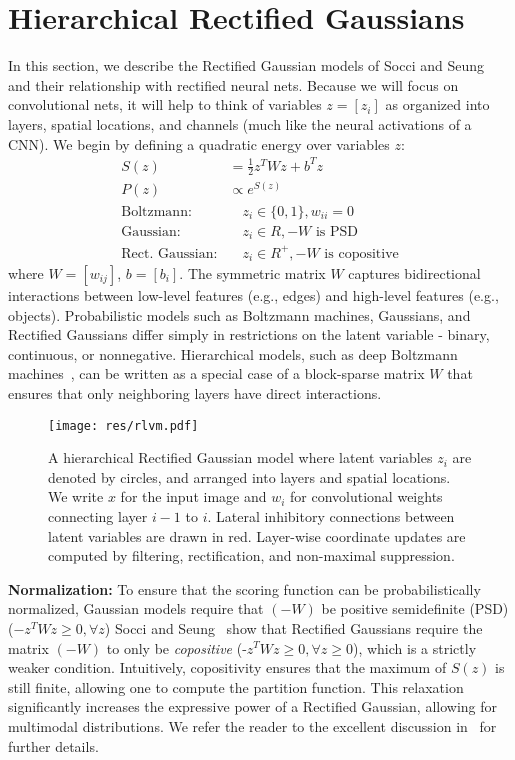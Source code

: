 \documentclass[10pt,twocolumn,letterpaper]{article}
\begin{document}
\section{Hierarchical Rectified Gaussians} \label{sec:lvm} In this
section, we describe the Rectified Gaussian models of Socci and
Seung~\cite{socci1998rectified} and their relationship with rectified
neural nets. Because we will focus on convolutional nets, it will help
to think of variables $z = [z_i]$ as organized into layers, spatial
locations, and channels (much like the neural activations of a CNN).
We begin by defining a quadratic energy over variables
$z$:
\begin{align}
  S(z) &= \frac{1}{2} z^T W z + b^Tz \label{eq:score}\\
  P(z) &\propto e^{S(z)} \nonumber\\
  \text{Boltzmann:} & \quad z_i \in \{0,1\}, w_{ii} = 0 \nonumber\\
  \text{Gaussian:} & \quad z_i \in R, -W \text{ is PSD} \nonumber\\\text{Rect. Gaussian:} & \quad z_i \in R^+, -W \text{ is copositive} \nonumber \end{align}
where $W = [w_{ij}]$, $b=[b_i]$. The symmetric matrix $W$ captures
bidirectional interactions between low-level features (e.g., edges)
and high-level features (e.g., objects). Probabilistic models such as
Boltzmann machines, Gaussians, and Rectified Gaussians differ simply
in restrictions on the latent variable - binary, continuous, or
nonnegative. Hierarchical models, such as deep Boltzmann
machines~\cite{salakhutdinov2009deep}, can be written as a special
case of a block-sparse matrix $W$ that ensures that only neighboring
layers have direct interactions.

\begin{figure}[t!]
  \centering
  \texttt{[image: res/rlvm.pdf]}
\caption{A hierarchical Rectified Gaussian model where latent
    variables $z_i$ are denoted by circles, and arranged into layers and
    spatial locations. We write $x$ for the input image and $w_i$ for
    convolutional weights connecting layer $i-1$ to $i$. Lateral
    inhibitory connections between latent variables are drawn in
    red. Layer-wise coordinate updates are computed by filtering,
    rectification, and non-maximal suppression.}
  \label{fig:rlvm}
\end{figure}

{\bf Normalization:} To ensure that the scoring function can be
probabilistically normalized, Gaussian models require that $(-W)$ be
positive semidefinite (PSD) ($-z^TWz \geq 0, \forall
z$) Socci and Seung~\cite{socci1998rectified} show that Rectified
Gaussians require the matrix $(-W)$ to only be {\em copositive}
(-$z^TWz \geq 0, \forall z \geq 0$), which is a strictly weaker
condition. Intuitively, copositivity ensures that the maximum of
$S(z)$ is still finite, allowing one to compute the partition
function. This relaxation significantly increases the expressive power
of a Rectified Gaussian, allowing for multimodal distributions. We
refer the reader to the excellent discussion
in~\cite{socci1998rectified} for further details.
\end{document}
